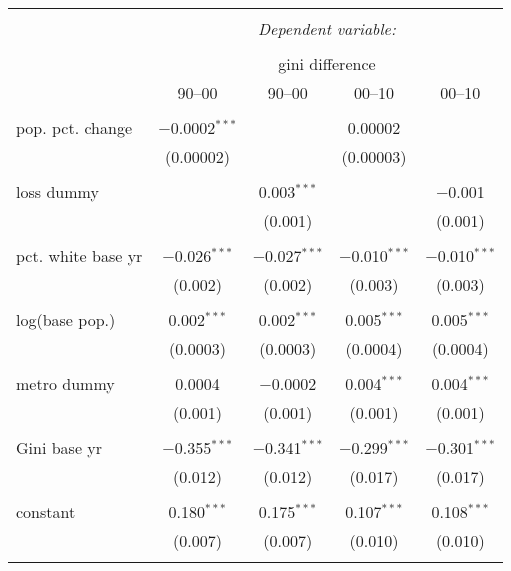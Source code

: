 \documentclass[12pt]{article}
\begin{document}
\begin{table}[p] \centering 
\begin{tabular}{@{\extracolsep{5pt}}lcccc} 
\\[-1.8ex]\hline 
\hline \\[-1.8ex] 
 & \multicolumn{4}{c}{\textit{Dependent variable:}} \\ 
\cline{2-5} 
\\[-1.8ex] & \multicolumn{4}{c}{gini difference} \\ 
 & 90--00 & 90--00 & 00--10 & 00--10 \\ 
\hline \\[-1.8ex] 
 pop. pct. change & $-$0.0002$^{***}$ &  & 0.00002 &  \\ 
  & (0.00002) &  & (0.00003) &  \\ 
  & & & & \\ 
 loss dummy &  & 0.003$^{***}$ &  & $-$0.001 \\ 
  &  & (0.001) &  & (0.001) \\ 
  & & & & \\ 
 pct. white base yr & $-$0.026$^{***}$ & $-$0.027$^{***}$ & $-$0.010$^{***}$ & $-$0.010$^{***}$ \\ 
  & (0.002) & (0.002) & (0.003) & (0.003) \\ 
  & & & & \\ 
 log(base pop.) & 0.002$^{***}$ & 0.002$^{***}$ & 0.005$^{***}$ & 0.005$^{***}$ \\ 
  & (0.0003) & (0.0003) & (0.0004) & (0.0004) \\ 
  & & & & \\ 
 metro dummy & 0.0004 & $-$0.0002 & 0.004$^{***}$ & 0.004$^{***}$ \\ 
  & (0.001) & (0.001) & (0.001) & (0.001) \\ 
  & & & & \\ 
 Gini base yr & $-$0.355$^{***}$ & $-$0.341$^{***}$ & $-$0.299$^{***}$ & $-$0.301$^{***}$ \\ 
  & (0.012) & (0.012) & (0.017) & (0.017) \\ 
  & & & & \\ 
 constant & 0.180$^{***}$ & 0.175$^{***}$ & 0.107$^{***}$ & 0.108$^{***}$ \\ 
  & (0.007) & (0.007) & (0.010) & (0.010) \\ 
  & & & & \\ 

\end{tabular}
\end{table}
\end{document}
